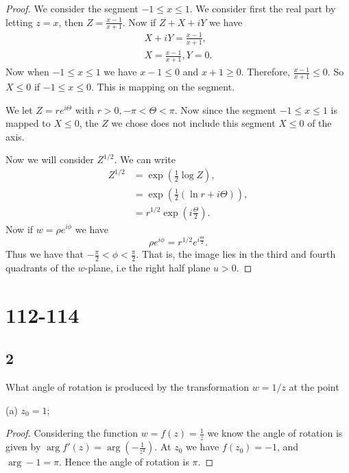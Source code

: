 \documentclass{article}
\begin{document}
\begin{proof}
    We consider the segment $-1\leq x \leq 1$. We consider first the real part
    by letting $z = x$, then $Z = \frac{x-1}{x+1}$. Now if $Z + X+iY$ we have
    \begin{gather*}
        X + iY = \frac{x - 1}{x + 1},\\
        X = \frac{x-1}{x+1}, Y = 0.
    \end{gather*}
    Now when $-1\leq x \leq 1$ we have $x -1 \leq 0$ and $x + 1 \geq 0$.
    Therefore, $\frac{x-1}{x+1} \leq 0$. So $X \leq 0$ if $-1\leq x \leq 0$.
    This is mapping on the segment.

    We let $Z= re^{i\Theta}$ with $r > 0, -\pi < \Theta < \pi$. Now since the
    segment $-1\leq x \leq 1$ is mapped to $X \leq 0$, the $Z$ we chose does
    not include this segment $X \leq 0$ of the axis.

    Now we will consider $Z^{1/2}$. We can write
    \begin{align*}
        Z^{1/2} & = \exp\left(\frac{1}{2}\log Z\right),            \\
                & = \exp\left(\frac{1}{2}(\ln r + i\Theta)\right), \\
                & = r^{1/2} \exp\left(i\frac{\Theta}{2}\right).
    \end{align*}
    Now if $w = \rho e^{i\phi}$ we have
    \begin{equation*}
        \rho e^{i\phi} = r^{1/2} e^{i\frac{\Theta}{2}}.
    \end{equation*}
    Thus we have that $-\frac{\pi}{2} < \phi < \frac{\pi}{2}$. That is, the image
    lies in the third and fourth quadrants of the $w$-plane, i.e the right half
    plane $u > 0$.

\end{proof}

\section*{112-114}
\subsection*{2}
What angle of rotation is produced by the transformation $w=1/z$ at the point

(a) $z_0 = 1$;

\begin{proof}
    Considering the function $w = f(z) = \frac{1}{z}$ we know the angle of
    rotation is given by $\arg f'(z) = \arg \left(-\frac{1}{z^2}\right)$. At
    $z_0$ we have $f(z_0) = -1$, and $\arg -1 = \pi$. Hence the angle of rotation
    is $\pi$.
\end{proof}
\end{document}

